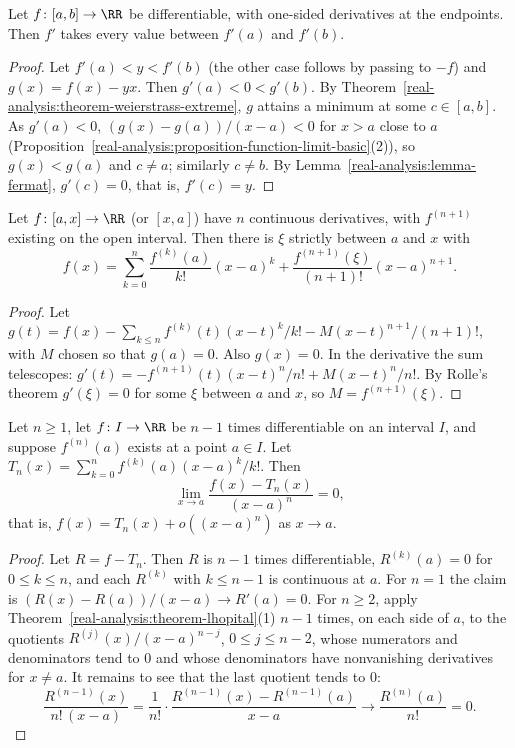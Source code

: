 \begin{theorem}[Darboux]\label{real-analysis:theorem-darboux}
Let $f \colon [a, b] \to \RR$ be differentiable, with one-sided derivatives at the endpoints. Then $f'$ takes every value between $f'(a)$ and $f'(b)$.
\end{theorem}

\begin{proof}
Let $f'(a) < y < f'(b)$ (the other case follows by passing to $-f$) and $g(x) = f(x) - yx$. Then $g'(a) < 0 < g'(b)$. By Theorem~\ref{real-analysis:theorem-weierstrass-extreme}, $g$ attains a minimum at some
$c \in [a, b]$. As $g'(a) < 0$, $(g(x) - g(a))/(x - a) < 0$ for $x > a$ close to $a$ (Proposition~\ref{real-analysis:proposition-function-limit-basic}(2)), so $g(x) < g(a)$ and $c \neq a$; similarly $c \neq b$. By
Lemma~\ref{real-analysis:lemma-fermat}, $g'(c) = 0$, that is, $f'(c) = y$.
\end{proof}

\begin{theorem}[Taylor]\label{real-analysis:theorem-taylor-one}
Let $f \colon [a, x] \to \RR$ (or $[x, a]$) have $n$ continuous derivatives, with $f^{(n+1)}$ existing on the open interval. Then there is $\xi$ strictly between $a$ and $x$ with
\[
f(x) = \sum_{k=0}^n\frac{f^{(k)}(a)}{k!}(x - a)^k + \frac{f^{(n+1)}(\xi)}{(n+1)!}(x - a)^{n+1}.
\]
\end{theorem}

\begin{proof}
Let $g(t) = f(x) - \sum_{k \leq n}f^{(k)}(t)(x - t)^k/k! - M(x - t)^{n+1}/(n+1)!$, with $M$ chosen so that $g(a) = 0$. Also $g(x) = 0$. In the derivative the sum telescopes:
$g'(t) = -f^{(n+1)}(t)(x - t)^n/n! + M(x - t)^n/n!$. By Rolle's theorem $g'(\xi) = 0$ for some $\xi$ between $a$ and $x$, so $M = f^{(n+1)}(\xi)$.
\end{proof}

\begin{proposition}\label{real-analysis:proposition-taylor-peano}
Let $n \geq 1$, let $f \colon I \to \RR$ be $n - 1$ times differentiable on an interval $I$, and suppose $f^{(n)}(a)$ exists at a point $a \in I$. Let $T_n(x) = \sum_{k=0}^nf^{(k)}(a)(x - a)^k/k!$. Then
\[
\lim_{x \to a}\frac{f(x) - T_n(x)}{(x - a)^n} = 0,
\]
that is, $f(x) = T_n(x) + o((x - a)^n)$ as $x \to a$.
\end{proposition}

\begin{proof}
Let $R = f - T_n$. Then $R$ is $n - 1$ times differentiable, $R^{(k)}(a) = 0$ for $0 \leq k \leq n$, and each $R^{(k)}$ with $k \leq n - 1$ is continuous at $a$. For $n = 1$ the claim is
$(R(x) - R(a))/(x - a) \to R'(a) = 0$. For $n \geq 2$, apply Theorem~\ref{real-analysis:theorem-lhopital}(1) $n - 1$ times, on each side of $a$, to the quotients $R^{(j)}(x)/(x - a)^{n-j}$, $0 \leq j \leq n - 2$, whose
numerators and denominators tend to $0$ and whose denominators have nonvanishing derivatives for $x \neq a$. It remains to see that the last quotient tends to $0$:
\[
\frac{R^{(n-1)}(x)}{n!\,(x - a)} = \frac{1}{n!}\cdot\frac{R^{(n-1)}(x) - R^{(n-1)}(a)}{x - a} \longrightarrow \frac{R^{(n)}(a)}{n!} = 0.
\]
\end{proof}

